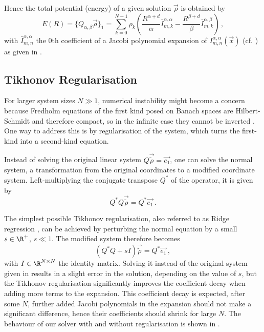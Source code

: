 
Hence the total potential (energy) of a given solution $\vec{\rho}$ is obtained by
\begin{equation}
  E(R) = \{Q_{\alpha,\beta} \vec{\rho}\}_1 = \sum_{k=0}^{N-1} \rho_k \left(\frac{R^{\alpha+d}}{\alpha} \bar{I}_{m,k}^{\alpha,\alpha} - \frac{R^{\beta+d}}{\beta} \bar{I}_{m,k}^{\alpha,\beta}\right)\,,
  \label{eq:total-energy-for-ansatz}
\end{equation}
with $\bar{I}_{m,n}^{\alpha,\alpha}$ the 0th coefficient of a Jacobi polynomial expansion of $I_{m,n}^{\alpha,\alpha}(\vec{x})$ (cf. ) as given in .

\subsection{Tikhonov Regularisation}
For larger system sizes $N \gg 1$, numerical instability might become a concern because Fredholm equations of the first kind posed on Banach spaces are Hilbert-Schmidt and therefore compact, so in the infinite case they cannot be inverted \parencite{2021-arbitrary-dimensions}.
One way to address this is by regularisation of the system, which turns the first-kind into a second-kind equation.

Instead of solving the original linear system $Q \vec{\tilde{\rho}} = \vec{e_1}$, one can solve the normal system, a transformation from the original coordinates to a modified coordinate system.
Left-multiplying the conjugate transpose $Q^*$ of the operator, it is given by
$$Q^* Q \vec{\tilde{\rho}} = Q^* \vec{e_1}\,.$$

The simplest possible Tikhonov regularisation, also referred to as Ridge regression \parencite{1970-ridge-regression}, can be achieved by perturbing the normal equation by a small $s \in \R^+$, $s \ll 1$.
The modified system therefore becomes
$$(Q^* Q + sI) \vec{\tilde{\rho}} = Q^* \vec{e_1}\,,$$
with $I \in \R^{N \times N}$ the identity matrix.
Solving it instead of the original system given in  results in a slight error in the solution, depending on the value of $s$, but the Tikhonov regularisation significantly improves the coefficient decay when adding more terms to the expansion.
This coefficient decay is expected, after some $N$, further added Jacobi polynomials in the expansion should not make a significant difference, hence their coefficients should shrink for large $N$.
The behaviour of our solver with and without regularisation is shown in .
